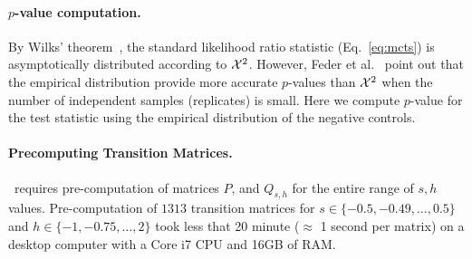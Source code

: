 \documentclass[11pt]{article}
\def\comale{\text{{\sc Comale}}}
\begin{document}
\paragraph{$p$-value computation.}
By Wilks’ theorem~\cite{williams2001weighing}, the standard likelihood
ratio statistic (Eq.~\ref{eq:mcts}) is asymptotically distributed
according to ${\cal X}^2$. However, Feder et
al.~\cite{feder2014Identifying} point out that the empirical
distribution provide more accurate $p$-values than ${\cal X}^2$ when the
number of independent samples (replicates) is small.  Here we compute
$p$-value for the test statistic using the empirical distribution of
the negative controls.


		
\paragraph{Precomputing Transition Matrices.}
\comale\ requires pre-computation of matrices $P$, and $Q_{s,h}$ for
the entire range of $s,h$ values. Pre-computation of $1313$ transition
matrices for $s\in\{-0.5,-0.49,\ldots,0.5 \}$ and $h\in
\{-1,-0.75,\ldots,2\}$ took less that 20 minute ($\approx$ 1 second per matrix) 
on a desktop computer
with a Core i7 CPU and 16GB of RAM.
\end{document}
